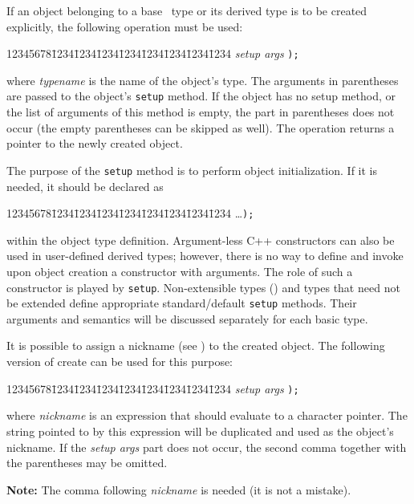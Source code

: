 If an object belonging to a base \smurph\ type or its derived type
is to be created explicitly,
the following operation must be used:
{\tt\begin{tabbing}
12345678\=1234\=1234\=1234\=1234\=1234\=1234\=1234\=1234\kill
{} {\em setup args\/} {\tt );} \\
\end{tabbing}}
\noindent
where {\em typename\/} is the name of the object's type.
The arguments in parentheses are passed to the object's
{\tt setup} method.
If the object has no setup method, or the list of arguments of this method is
empty, the part in parentheses does not occur (the empty parentheses can be
skipped as well).
The operation returns a pointer to the newly created object.

The purpose of the {\tt setup} method is to perform object
initialization.
If it is needed, it should be declared as
{\tt\begin{tabbing}
12345678\=1234\=1234\=1234\=1234\=1234\=1234\=1234\=1234\kill
{}\ldots {\tt );}
\end{tabbing}}
\noindent
within the object type definition.
Argument-less C++ constructors can also be used in user-defined derived
{\smurph}
types; however, there is no way to define and invoke upon object
creation a constructor with arguments.
The role of such a constructor is played by {\tt setup}.
Non-extensible types () and types that need not be
extended define appropriate standard/default {\tt setup} methods.
Their arguments and semantics will be discussed separately for each 
basic type.

It is possible to assign a nickname (see )
to the created object.
The following version of create can be used for this purpose:
{\tt\begin{tabbing}
12345678\=1234\=1234\=1234\=1234\=1234\=1234\=1234\=1234\kill
{} {\em setup args\/} {\tt );}
\end{tabbing}}
\noindent
where {\em nickname\/} is an expression that should evaluate to a
character pointer.
The string pointed to by this expression will be duplicated and used
as the object's nickname.
If the {\em setup args\/} part does not occur, the second comma together
with the parentheses may be omitted.

\medskip
\noindent
{\bf Note:} The comma following {\em nickname\/} is needed (it
is not a mistake).

\medskip
\noindent

